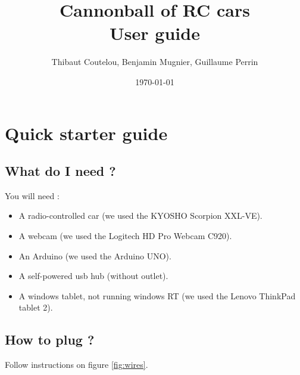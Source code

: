 \documentclass[a4paper,11pt]{report}
\title{Cannonball of RC cars\\User guide}
\author{Thibaut Coutelou, Benjamin Mugnier, Guillaume Perrin}
\date{\today}
\begin{document}
\maketitle
\tableofcontents

\setlength{\parskip}{3mm}










\chapter{Quick starter guide}

\section{What do I need ?}

You will need :
\begin{itemize}

    \item A radio-controlled car (we used the KYOSHO Scorpion XXL-VE).

    \item A webcam (we used the Logitech HD Pro Webcam C920).

    \item An Arduino (we used the Arduino UNO).

    \item A self-powered usb hub (without outlet).

    \item A windows tablet, not running windows RT (we used the Lenovo ThinkPad
        tablet 2).

\end{itemize}

\section{How to plug ?}

Follow instructions on figure \ref{fig:wires}.
\end{document}
